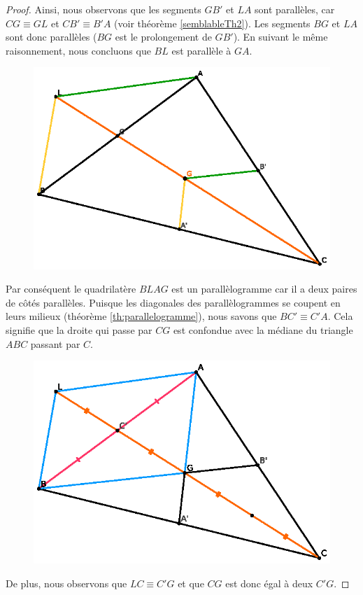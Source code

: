\documentclass[a4paper,12pt]{article}
\begin{document}
\begin{proof}
Ainsi, nous observons que les segments $GB'$ et $LA$ sont parallèles, car $CG \equiv GL$ et $CB' \equiv B'A$ (voir théorème \ref{semblableTh2}). Les segments $BG$ et $LA$ sont donc parallèles ($BG$ est le prolongement de $GB'$). En suivant le même raisonnement, nous concluons que $BL$ est parallèle à $GA$. 

\begin{figure}[H]
        \centering
        \includegraphics[scale=0.2]{mediane2.eps}
    \end{figure}

Par conséquent le quadrilatère $BLAG$ est un parallèlogramme car il a deux paires de côtés parallèles. Puisque les diagonales des parallèlogrammes se coupent en leurs milieux (théorème \ref{th:parallelogramme}), nous savons que $BC' \equiv C'A$. Cela signifie que la droite qui passe par $CG$ est confondue avec la médiane du triangle $ABC$ passant par $C$.\\

\begin{figure}[H]
        \centering
        \includegraphics[scale=0.2]{mediane3.eps}
    \end{figure}

De plus, nous observons que $LC \equiv C'G$  et que $CG$ est donc égal à deux $C'G$.
\end{proof}
\end{document}
